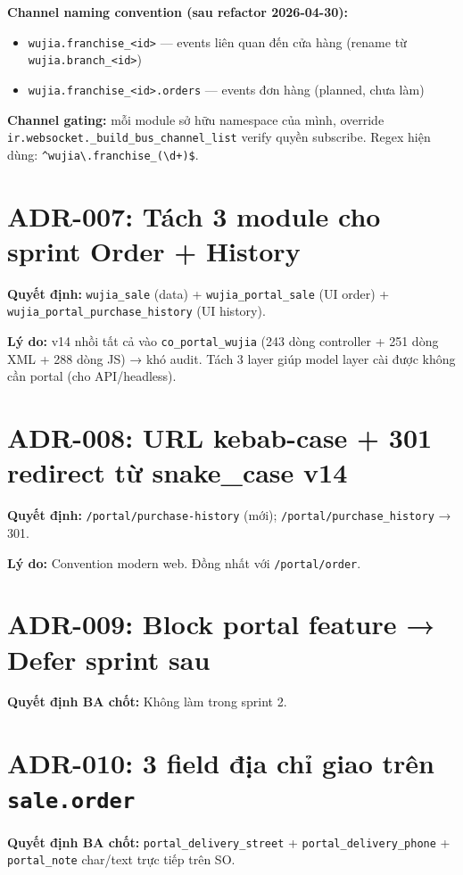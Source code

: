 \textbf{Channel naming convention (sau refactor 2026-04-30):}
\begin{itemize}
    \item \texttt{wujia.franchise\_<id>} --- events liên quan đến cửa hàng (rename từ \texttt{wujia.branch\_<id>})
    \item \texttt{wujia.franchise\_<id>.orders} --- events đơn hàng (planned, chưa làm)
\end{itemize}

\textbf{Channel gating:} mỗi module sở hữu namespace của mình, override \texttt{ir.websocket.\_build\_bus\_channel\_list} verify quyền subscribe. Regex hiện dùng: \verb|^wujia\.franchise_(\d+)$|.

\section{ADR-007: Tách 3 module cho sprint Order + History}

\textbf{Quyết định:} \texttt{wujia\_sale} (data) + \texttt{wujia\_portal\_sale} (UI order) + \texttt{wujia\_portal\_purchase\_history} (UI history).

\textbf{Lý do:} v14 nhồi tất cả vào \texttt{co\_portal\_wujia} (243 dòng controller + 251 dòng XML + 288 dòng JS) → khó audit. Tách 3 layer giúp model layer cài được không cần portal (cho API/headless).

\section{ADR-008: URL kebab-case + 301 redirect từ snake\_case v14}

\textbf{Quyết định:} \texttt{/portal/purchase-history} (mới); \texttt{/portal/purchase\_history} → 301.

\textbf{Lý do:} Convention modern web. Đồng nhất với \texttt{/portal/order}.

\section{ADR-009: Block portal feature → Defer sprint sau}

\textbf{Quyết định BA chốt:} Không làm trong sprint 2.

\section{ADR-010: 3 field địa chỉ giao trên \texttt{sale.order}}

\textbf{Quyết định BA chốt:} \texttt{portal\_delivery\_street} + \texttt{portal\_delivery\_phone} + \texttt{portal\_note} char/text trực tiếp trên SO.

